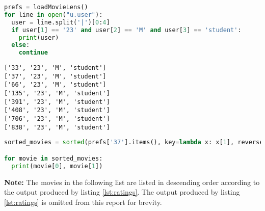 \documentclass[12pt]{article}
\begin{document}
\begin{lstlisting}[language=Python, caption=Python code used to determine users similar to me., label=lst:similar]
prefs = loadMovieLens()
for line in open("u.user"):
  user = line.split('|')[0:4]
  if user[1] == '23' and user[2] == 'M' and user[3] == 'student':
    print(user)
  else:
    continue
\end{lstlisting}

\begin{lstlisting}[caption=Output of users similar to me based on age gender and occupation, label=lst:users]
['33', '23', 'M', 'student']
['37', '23', 'M', 'student']
['66', '23', 'M', 'student']
['135', '23', 'M', 'student']
['391', '23', 'M', 'student']
['408', '23', 'M', 'student']
['706', '23', 'M', 'student']
['838', '23', 'M', 'student']
\end{lstlisting}

\begin{lstlisting}[language=Python, caption=Python code for printing out a sorted list of a user's rated movies along with their ratings, label=lst:ratings]
sorted_movies = sorted(prefs['37'].items(), key=lambda x: x[1], reverse=True)

for movie in sorted_movies:
  print(movie[0], movie[1])
\end{lstlisting}

\textbf{Note:} The movies in the following list are listed in descending order according to the output produced by listing \ref{lst:ratings}.  The output produced by listing \ref{lst:ratings} is omitted from this report for brevity.
\end{document}

